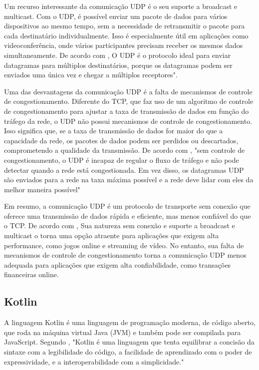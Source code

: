\documentclass[12pt]{article}
\begin{document}
Um recurso interessante da comunicação UDP é o seu suporte a broadcast e multicast. Com o UDP, é possível enviar um pacote de dados para vários dispositivos ao mesmo tempo, sem a necessidade de retransmitir o pacote para cada destinatário individualmente. Isso é especialmente útil em aplicações como videoconferência, onde vários participantes precisam receber os mesmos dados simultaneamente. De acordo com \cite{tanenbaum2011redes}, O UDP é o protocolo ideal para enviar datagramas para múltiplos destinatários, porque os datagramas podem ser enviados uma única vez e chegar a múltiplos receptores".

Uma das desvantagens da comunicação UDP é a falta de mecanismos de controle de congestionamento. Diferente do TCP, que faz uso de um algoritmo de controle de congestionamento para ajustar a taxa de transmissão de dados em função do tráfego da rede, o UDP não possui mecanismos de controle de congestionamento. Isso significa que, se a taxa de transmissão de dados for maior do que a capacidade da rede, os pacotes de dados podem ser perdidos ou descartados, comprometendo a qualidade da transmissão. De acordo com \cite{stallings2017redes}, "sem controle de congestionamento, o UDP é incapaz de regular o fluxo de tráfego e não pode detectar quando a rede está congestionada. Em vez disso, os datagramas UDP são enviados para a rede na taxa máxima possível e a rede deve lidar com eles da melhor maneira possível"


Em resumo, a comunicação UDP é um protocolo de transporte sem conexão que oferece uma transmissão de dados rápida e eficiente, mas menos confiável do que o TCP. De acordo com \cite{tanenbaum2011redes}, Sua natureza sem conexão e suporte a broadcast e multicast o torna uma opção atraente para aplicações que exigem alta performance, como jogos online e streaming de vídeo. No entanto, sua falta de mecanismos de controle de congestionamento torna a comunicação UDP menos adequada para aplicações que exigem alta confiabilidade, como transações financeiras online.

\subsection{Kotlin}
A linguagem Kotlin é uma linguagem de programação moderna, de código aberto, que roda na máquina virtual Java (JVM) e também pode ser compilada para JavaScript. Segundo \cite{subramaniam2017programming}, "Kotlin é uma linguagem que tenta equilibrar a concisão da sintaxe com a legibilidade do código, a facilidade de aprendizado com o poder de expressividade, e a interoperabilidade com a simplicidade."
\end{document}
